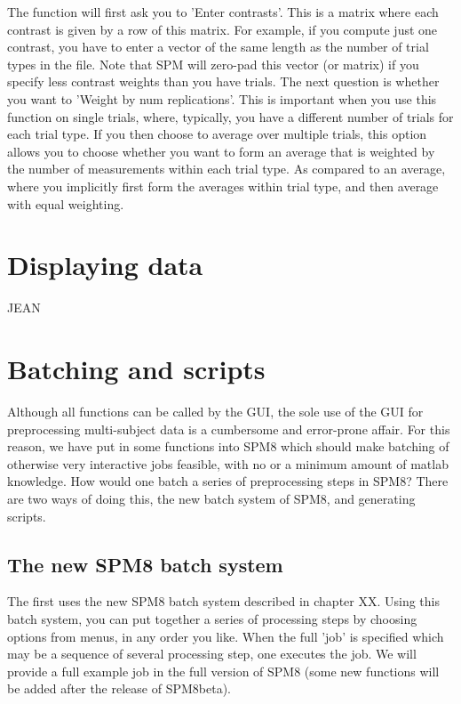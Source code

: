 The function will first ask you to 'Enter contrasts'. 
This is a matrix where each contrast is given by a row of 
this matrix. For example, if you compute just one contrast,
you have to enter a vector of the same length as the number of 
trial types in the file. Note that SPM will zero-pad this vector
 (or matrix) if you specify less contrast weights than you have trials.
 The next question is whether you want to 'Weight by num replications'. 
This is important when you use this function on single trials, where, 
typically, you have a different number of trials for each trial type. 
If you then choose to average over multiple trials, this option allows 
you to choose whether you want to form an average that is weighted 
by the number of measurements within each trial type. As compared 
to an average, where you implicitly first form the averages within 
trial type, and then average with equal weighting.

\section{Displaying data}
JEAN


\section{Batching and scripts}
Although all functions can be called by the GUI, the sole use 
of the GUI for preprocessing multi-subject data is a cumbersome 
and error-prone affair. For this reason, we have put in some functions 
into SPM8 which should make batching of otherwise very interactive jobs 
feasible, with no or a minimum amount of matlab knowledge.
How would one batch a series of preprocessing steps in SPM8? 
There are two ways of doing this, the new batch system of SPM8, and generating scripts. 

\subsection{The new SPM8 batch system}
The first uses the new SPM8 batch system described in chapter XX. 
Using this batch system, you can put together a series of processing
steps by choosing options from menus, in any order you like. 
When the full 'job' is specified which may be a sequence of several 
processing step, one executes the job. We will provide a full example
job in the full version of SPM8 (some new functions will be added after the release of SPM8beta). 


